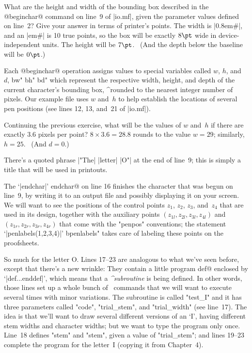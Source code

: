\exercise What are the height and width of the bounding box described
in the @beginchar@ command on line~9 of |io.mf|, given the parameter
values defined on line~2? Give your answer in terms of printer's points.
\answer The width is |0.8em#|, and an |em#| is 10 true points, so the
box will be exactly $8\pt$ wide in device-independent units. The
height will be $7\pt$. \ (And the depth below the baseline will be $0\pt$.)

Each @beginchar@ operation assigns values to special variables called
$w$, $h$, and~$d$, ^^"w" ^^"h" ^^"d" which represent the respective
width, height, and depth of the current character's bounding box,
^{rounded} to the nearest integer number of pixels. Our example file
uses $w$ and~$h$ to help establish the locations of several pen positions
(see lines 12, 13, and~21 of |io.mf|).

\exercise Continuing the previous exercise, what will be the values of
$w$ and~$h$ if there are exactly 3.6 pixels per point?
\answer $8\times3.6=28.8$ rounds to the value $w=29$; similarly, $h=25$.
\ (And $d=0$.)

There's a quoted phrase |"The| |letter| |O"| at the end of line~9; this is
simply a title that will be used in printouts.

The `|endchar|' ^^@endchar@ on line 16 finishes the character that was
begun on line~9, by writing it to an output file and possibly displaying
it on your screen. We will want
to see the positions of the control points $z_1$, $z_2$,
$z_3$, and~$z_4$ that are used in its design, together with the auxiliary
points $(z_{1l},z_{2l},z_{3l},z_{4l})$ and $(z_{1r},z_{2r},z_{3r},z_{4r})$
that come with the "penpos" conventions; the statement `|penlabels(1,2,3,4)|'
^^"penlabels" takes care of labeling these points on the proofsheets.

So much for the letter O. Lines 17--23 are analogous to what we've seen
before, except that there's a new wrinkle: They contain a little program
^^@def@ enclosed by `|def...enddef|', which means that a
{\sl^{subroutine}\/} is being defined.  In other words, those lines set up
a whole bunch of \MF\ commands that we will want to execute several times
with minor variations. The subroutine is called "test\_I" and it has three
parameters called "code", "trial\_stem", and "trial\_width" (see line~17).
The idea is that we'll want to draw several different versions of an `I',
having different stem widths and character widths; but we want to type the
program only once. Line~18 defines "stem"\0 and "stem", given a value of
"trial\_stem"; and lines 19--23 complete the program for the letter~I
(copying it from Chapter~4).

